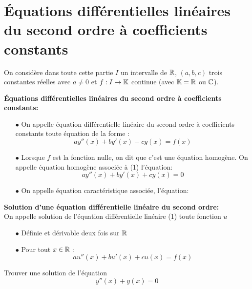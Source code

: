 \documentclass[a4paper, 11pt]{article}
\begin{document}

\newpage
\section{\'Equations diff\'erentielles lin\'eaires du second ordre \`a coefficients constants}

\noindent On consid\`{e}re dans toute cette partie $I$ un intervalle de $\mathbb{R}$, $(a,b,c)$ trois constantes r\'eelles avec $a\not= 0$ et $f: I\rightarrow \mathbb{K}$ continue (avec $\mathbb{K}=\mathbb{R}$ ou $\mathbb{C}$).



\begin{defi}
  \textbf{\'Equations diff\'erentielles lin\'eaires du second ordre \`a coefficients constants:}
  \begin{itemize}
    \item[$\bullet$] On appelle \'equation diff\'erentielle lin\'eaire du second ordre \`a coefficients constants toute \'equation de la forme :
          $$ay''(x)+by'(x)+cy(x)=f(x)$$

    \item[$\bullet$] Lorsque $f$ est la fonction nulle, on dit que c'est une \'equation homogène.
          \noindent On appelle \'equation homog\`ene associ\'ee \`a (1) l'\'equation:  $$ay''(x)+by'(x)+cy(x)=0$$
    \item[$\bullet$] On appelle \'equation caract\'eristique associ\'ee, l'\'equation: $$ $$
  \end{itemize}
\end{defi}


\begin{defi}
  \textbf{Solution d'une \'equation diff\'erentielle lin\'eaire du second ordre:}\\
  \noindent On appelle solution de l'\'equation diff\'erentielle lin\'eaire (1) toute fonction $u$
  \begin{itemize}
    \item[$\bullet$] Définie et dérivable deux fois sur $\mathbb{R}$
    \item[$\bullet$] Pour tout $x\in \mathbb{R}$ : $$au''(x) +bu'(x) +cu(x)=f(x)$$
  \end{itemize}
\end{defi}


\begin{exercice}
  Trouver une solution de l'équation
  $$y''(x)+y(x)=0$$
\end{exercice}
\end{document}
